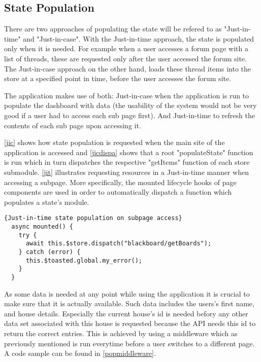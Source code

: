 \subsection{State Population} \label{statepopulation}
There are two approaches of populating the state will be refered to as "Just-in-time" and "Just-in-case". With the Just-in-time approach, the state is populated only when it is needed. For example when a user accesses a forum page with a list of threads, these are requested only after the user accessed the forum site. The Just-in-case approach on the other hand, loads these thread items into the store at a specified point in time, before the user accesses the forum site. 

The application makes use of both: Just-in-case when the application is run to populate the dashboard with data (the usability of the system would not be very good if a user had to access each sub page first). And Just-in-time to refresh the contents of each sub page upon accessing it.

\autoref{jic} shows how state population is requested when the main site of the application is accessed and \autoref{jicdispa} shows that a root "populateState" function is run which in turn dispatches the respective "getItems" function of each store submodule. \autoref{jit} illustrates requesting resources in a Just-in-time manner when accessing a subpage. More specifically, the mounted lifecycle hooks of page components are used in order to automatically dispatch a function which populates a state's module. \newline

\begin{lstlisting}[caption=Just-in-time state population on subpage access, captionpos=b, style=htmlcssjs, label=jit]{Just-in-time state population on subpage access}
  async mounted() {
    try {
      await this.$store.dispatch("blackboard/getBoards");
    } catch (error) {
      this.$toasted.global.my_error();
    }
  }
\end{lstlisting}

As some data is needed at any point while using the application it is crucial to make sure that it is actually available. Such data includes the users's first name, and house details. Especially the current house's id is needed befory any other data set associated with this house is requested because the API needs this id to return the correct entries. This is achieved by using a middleware which as previously mentioned is run everytime before a user switches to a different page. A code sample can be found in \autoref{popmiddleware}.

